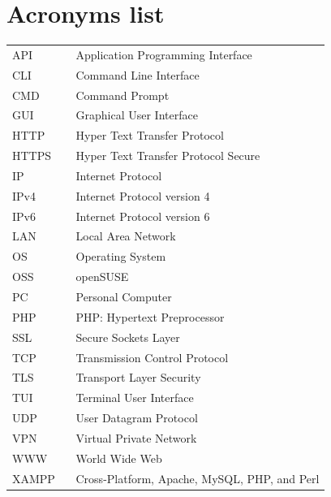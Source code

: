 \documentclass[11pt,a4paper]{report}
\begin{document}
\listoffigures
{}

\listoftables
{}

\lstlistoflistings
{}

\chapter*{Acronyms list}

    \begin{flushleft}
        \begin{tabular}{l p{0.8\linewidth}}
            API     & Application Programming Interface\\
            CLI     & Command Line Interface\\
            CMD     & Command Prompt\\
            GUI     & Graphical User Interface\\
            HTTP    & Hyper Text Transfer Protocol\\
            HTTPS   & Hyper Text Transfer Protocol Secure\\
            IP      & Internet Protocol\\
            IPv4    & Internet Protocol version 4\\
            IPv6    & Internet Protocol version 6\\
            LAN     & Local Area Network\\
            OS      & Operating System\\
            OSS     & openSUSE\\
            PC      & Personal Computer\\
            PHP     & PHP: Hypertext Preprocessor\\
            SSL     & Secure Sockets Layer\\
            TCP     & Transmission Control Protocol\\
            TLS     & Transport Layer Security\\
            TUI     & Terminal User Interface\\ %
            UDP     & User Datagram Protocol\\
            VPN     & Virtual Private Network\\
            WWW     & World Wide Web\\
            XAMPP   & Cross-Platform, Apache, MySQL, PHP, and Perl
        \end{tabular}
    \end{flushleft}
\end{document}
